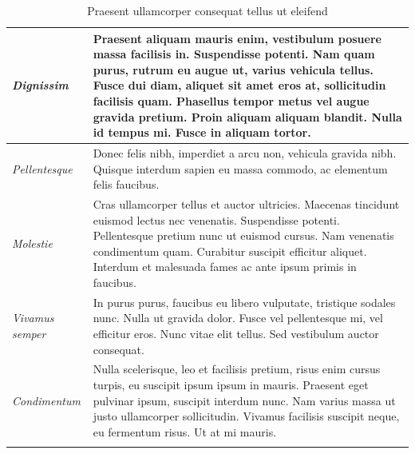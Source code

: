 \begin{center}
\begin{longtable}{ | p{} | p{} | }
				\emph{Dignissim}
				& Praesent aliquam mauris enim, vestibulum posuere massa facilisis in. Suspendisse potenti. Nam quam purus, rutrum eu augue ut, varius vehicula tellus. Fusce dui diam, aliquet sit amet eros at, sollicitudin facilisis quam. Phasellus tempor metus vel augue gravida pretium. Proin aliquam aliquam blandit. Nulla id tempus mi. Fusce in aliquam tortor.
				\\ \hline
				
				\emph{Pellentesque}
				& Donec felis nibh, imperdiet a arcu non, vehicula gravida nibh. Quisque interdum sapien eu massa commodo, ac elementum felis faucibus.
				\\ \hline
				
				\emph{Molestie}
				& Cras ullamcorper tellus et auctor ultricies. Maecenas tincidunt euismod lectus nec venenatis. Suspendisse potenti. Pellentesque pretium nunc ut euismod cursus. Nam venenatis condimentum quam. Curabitur suscipit efficitur aliquet. Interdum et malesuada fames ac ante ipsum primis in faucibus.
				\\ \hline
				
				\emph{Vivamus semper}
				& In purus purus, faucibus eu libero vulputate, tristique sodales nunc. Nulla ut gravida dolor. Fusce vel pellentesque mi, vel efficitur eros. Nunc vitae elit tellus. Sed vestibulum auctor consequat. 
				\\ \hline
				
				\emph{Condimentum}
				& Nulla scelerisque, leo et facilisis pretium, risus enim cursus turpis, eu suscipit ipsum ipsum in mauris. Praesent eget pulvinar ipsum, suscipit interdum nunc. Nam varius massa ut justo ullamcorper sollicitudin. Vivamus facilisis suscipit neque, eu fermentum risus. Ut at mi mauris.
				\\ \hline
				
				\caption{Praesent ullamcorper consequat tellus ut eleifend}
				\label{tab:example-3}		
			\end{longtable}
		\end{center}
\fi